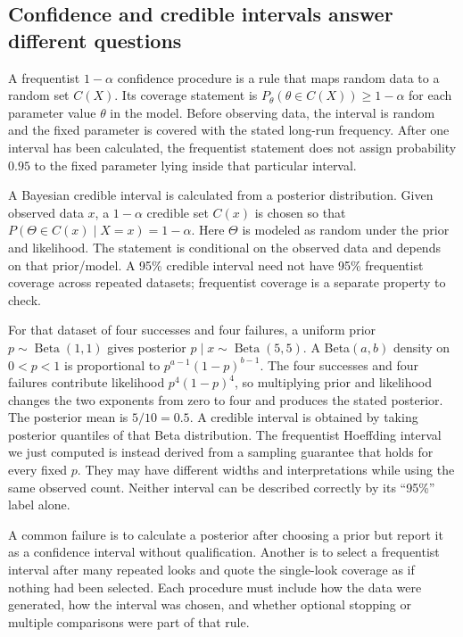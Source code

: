 \subsection{Confidence and credible intervals answer different questions}\label{02-foundations-ii-ch029-confidence-and-credible-intervals-answer-different-questions}

A frequentist \(1-\alpha\) confidence procedure is a rule that maps random data to a random set \(C(X)\). Its coverage statement is \(P_\theta(\theta\in C(X))\ge1-\alpha\) for each parameter value \(\theta\) in the model. Before observing data, the interval is random and the fixed parameter is covered with the stated long-run frequency. After one interval has been calculated, the frequentist statement does not assign probability \(0.95\) to the fixed parameter lying inside that particular interval.

A Bayesian credible interval is calculated from a posterior distribution. Given observed data \(x\), a \(1-\alpha\) credible set \(C(x)\) is chosen so that \(P(\Theta\in C(x)\mid X=x)=1-\alpha\). Here \(\Theta\) is modeled as random under the prior and likelihood. The statement is conditional on the observed data and depends on that prior/model. A 95\% credible interval need not have 95\% frequentist coverage across repeated datasets; frequentist coverage is a separate property to check.

For that dataset of four successes and four failures, a uniform prior \(p\sim\operatorname{Beta}(1,1)\) gives posterior \(p\mid x\sim\operatorname{Beta}(5,5)\). A Beta\((a,b)\) density on \(0<p<1\) is proportional to \(p^{a-1}(1-p)^{b-1}\). The four successes and four failures contribute likelihood \(p^4(1-p)^4\), so multiplying prior and likelihood changes the two exponents from zero to four and produces the stated posterior. The posterior mean is \(5/10=0.5\). A credible interval is obtained by taking posterior quantiles of that Beta distribution. The frequentist Hoeffding interval we just computed is instead derived from a sampling guarantee that holds for every fixed \(p\). They may have different widths and interpretations while using the same observed count. Neither interval can be described correctly by its ``95\%'' label alone.

A common failure is to calculate a posterior after choosing a prior but report it as a confidence interval without qualification. Another is to select a frequentist interval after many repeated looks and quote the single-look coverage as if nothing had been selected. Each procedure must include how the data were generated, how the interval was chosen, and whether optional stopping or multiple comparisons were part of that rule.


